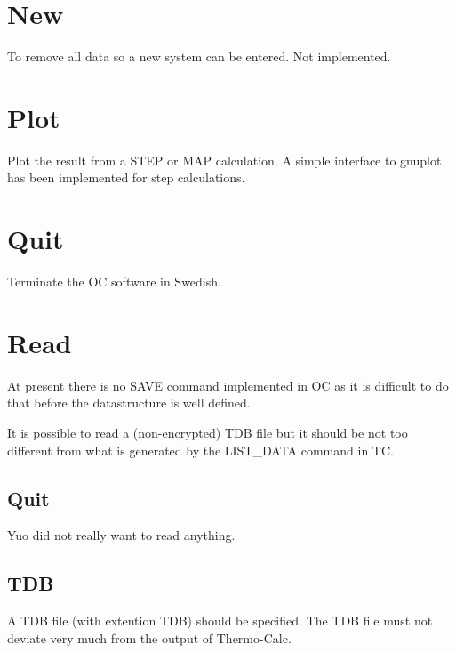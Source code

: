 \documentclass[12pt]{article}
\begin{document}
\section{New }

To remove all data so a new system can be entered.  Not implemented.

\section{Plot }

Plot the result from a STEP or MAP calculation.  A simple interface to
gnuplot has been implemented for step calculations.

\section{Quit }

Terminate the OC software in Swedish.

\section{Read }

At present there is no SAVE command implemented in OC as it is
difficult to do that before the datastructure is well defined.

It is possible to read a (non-encrypted) TDB file but it should be not
too different from what is generated by the LIST\_DATA command in TC.

\subsection{Quit}

Yuo did not really want to read anything.

\subsection{TDB}

A TDB file (with extention TDB) should be specified.  The TDB file
must not deviate very much from the output of Thermo-Calc.
\end{document}
